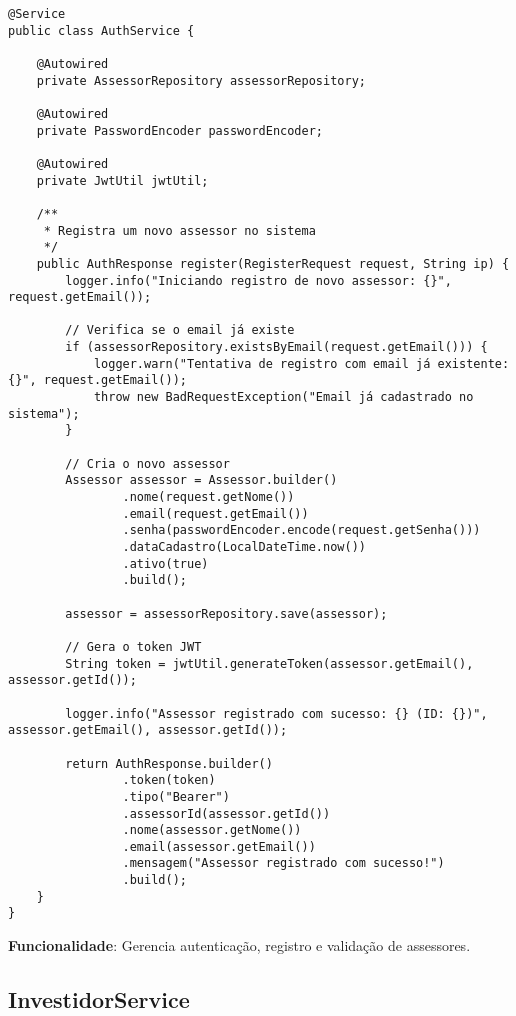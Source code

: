 \documentclass[12pt,a4paper]{article}
\begin{document}
\begin{lstlisting}[caption=AuthService - Registro de Assessor]
@Service
public class AuthService {
    
    @Autowired
    private AssessorRepository assessorRepository;
    
    @Autowired
    private PasswordEncoder passwordEncoder;
    
    @Autowired
    private JwtUtil jwtUtil;
    
    /**
     * Registra um novo assessor no sistema
     */
    public AuthResponse register(RegisterRequest request, String ip) {
        logger.info("Iniciando registro de novo assessor: {}", request.getEmail());

        // Verifica se o email já existe
        if (assessorRepository.existsByEmail(request.getEmail())) {
            logger.warn("Tentativa de registro com email já existente: {}", request.getEmail());
            throw new BadRequestException("Email já cadastrado no sistema");
        }

        // Cria o novo assessor
        Assessor assessor = Assessor.builder()
                .nome(request.getNome())
                .email(request.getEmail())
                .senha(passwordEncoder.encode(request.getSenha()))
                .dataCadastro(LocalDateTime.now())
                .ativo(true)
                .build();

        assessor = assessorRepository.save(assessor);

        // Gera o token JWT
        String token = jwtUtil.generateToken(assessor.getEmail(), assessor.getId());

        logger.info("Assessor registrado com sucesso: {} (ID: {})", assessor.getEmail(), assessor.getId());

        return AuthResponse.builder()
                .token(token)
                .tipo("Bearer")
                .assessorId(assessor.getId())
                .nome(assessor.getNome())
                .email(assessor.getEmail())
                .mensagem("Assessor registrado com sucesso!")
                .build();
    }
}
\end{lstlisting}

\textbf{Funcionalidade}: Gerencia autenticação, registro e validação de assessores.

\subsection{InvestidorService}
\end{document}
